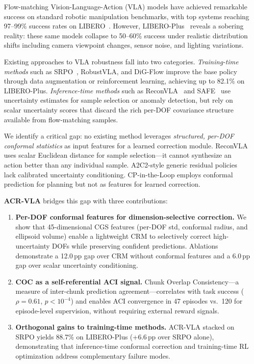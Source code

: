 \documentclass[letterpaper]{article}
\begin{document}
Flow-matching Vision-Language-Action (VLA) models have achieved remarkable success on standard robotic manipulation benchmarks, with top systems reaching 97--99\% success rates on LIBERO~\cite{liu2024libero}.
However, LIBERO-Plus~\cite{liberoplus2025} reveals a sobering reality: these same models collapse to 50--60\% success under realistic distribution shifts including camera viewpoint changes, sensor noise, and lighting variations.

Existing approaches to VLA robustness fall into two categories.
\emph{Training-time methods} such as SRPO~\cite{srpo2025}, RobustVLA, and DiG-Flow improve the base policy through data augmentation or reinforcement learning, achieving up to 82.1\% on LIBERO-Plus.
\emph{Inference-time methods} such as ReconVLA~\cite{reconvla2025} and SAFE~\cite{safe2025} use uncertainty estimates for sample selection or anomaly detection, but rely on scalar uncertainty scores that discard the rich per-DOF covariance structure available from flow-matching samples.

We identify a critical gap: no existing method leverages \emph{structured, per-DOF conformal statistics} as input features for a learned correction module.
ReconVLA uses scalar Euclidean distance for sample selection---it cannot synthesize an action better than any individual sample.
A2C2-style generic residual policies lack calibrated uncertainty conditioning.
CP-in-the-Loop employs conformal prediction for planning but not as features for learned correction.

\textbf{ACR-VLA} bridges this gap with three contributions:
\begin{enumerate}[leftmargin=*,nosep]
\item \textbf{Per-DOF conformal features for dimension-selective correction.}
  We show that 45-dimensional CGS features (per-DOF std, conformal radius, and ellipsoid volume) enable a lightweight CRM to selectively correct high-uncertainty DOFs while preserving confident predictions. Ablations demonstrate a 12.0\,pp gap over CRM without conformal features and a 6.0\,pp gap over scalar uncertainty conditioning.
\item \textbf{COC as a self-referential ACI signal.}
  Chunk Overlap Consistency---a measure of inter-chunk prediction agreement---correlates with task success ($\rho{=}0.61$, $p{<}10^{-4}$) and enables ACI convergence in 47 episodes vs.\ 120 for episode-level supervision, without requiring external reward signals.
\item \textbf{Orthogonal gains to training-time methods.}
  ACR-VLA stacked on SRPO yields 88.7\% on LIBERO-Plus (+6.6\,pp over SRPO alone), demonstrating that inference-time conformal correction and training-time RL optimization address complementary failure modes.
\end{enumerate}
\end{document}
